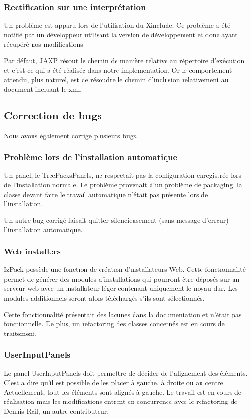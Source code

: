 \subsubsection{Rectification sur une interprétation}
Un problème est apparu lors de l'utilisation du Xinclude.
Ce problème a été notifié par un développeur utilisant la version de développement et donc ayant récupéré nos modifications.

Par défaut, JAXP résout le chemin de manière relative au répertoire d'exécution et c'est ce qui a été réalisée dans notre implementation.
Or le comportement attendu, plus naturel, est de résoudre le chemin d'inclusion relativement au document incluant le xml.

\subsection{Correction de bugs}
Nous avons également corrigé plusieurs bugs.
\subsubsection{Problème lors de l'installation automatique}
Un panel, le TreePacksPanels, ne respectait pas la configuration enregistrée lors de l'installation normale.
Le problème provenait d'un problème de packaging, la classe devant faire le travail automatique n'était pas présente lors de l'installation.

Un autre bug corrigé faisait quitter silencieusement (sans message d'erreur) l'installation automatique.
\subsubsection{Web installers}
IzPack possède une fonction de création d'installateurs Web.
Cette fonctionnalité permet de générer des modules d'installations qui pourront être déposés sur un serveur web avec un installateur léger contenant uniquement le noyau dur.
Les modules additionnels seront alors téléchargés s'ils sont sélectionnés.

Cette fonctionnalité présentait des lacunes dans la documentation et n'était pas fonctionnelle.
De plus, un refactoring des classes concernés est en cours de traitement.
\subsubsection{UserInputPanels}
Le panel UserInputPanels doit permettre de décider de l'alignement des éléments.
C'est a dire qu'il est possible de les placer à gauche, à droite ou au centre. Actuellement, tout les éléments sont alignés à gauche.
Le travail est en cours de réalisation mais les modifications entrent en concurrence avec le refactoring de Dennis Reil, un autre contributeur.

